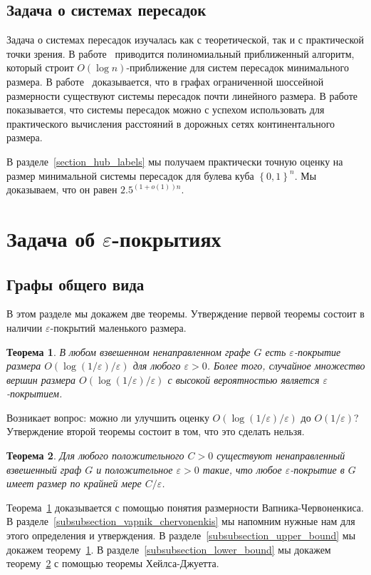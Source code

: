 \documentclass[12pt]{article}
\newcommand{\eps}{\varepsilon}
\newcommand{\set}[1]{\left\{#1\right\}}
\newcommand{\zo}{\set{0, 1}}
\newtheorem{theorem}{Теорема}
\begin{document}
    \subsection{Задача о системах пересадок}

    Задача о системах пересадок изучалась как с теоретической, так и с практической точки зрения.
    В работе~\cite{CHKZ02} приводится полиномиальный приближенный алгоритм, который строит $O(\log n)$-приближение
    для систем пересадок минимального размера.
    В работе~\cite{AFGW10} доказывается, что в графах ограниченной шоссейной размерности существуют системы пересадок
    почти линейного размера.
    В работе~\cite{ADGW11} показывается, что системы пересадок можно с успехом использовать для практического
    вычисления расстояний в дорожных сетях континентального размера.

    В разделе~\ref{section_hub_labels} мы получаем практически точную оценку на размер минимальной системы пересадок
    для булева куба $\zo^n$. Мы доказываем, что он равен $2.5^{(1 + o(1)) n}$.
    \section{Задача об $\eps$-покрытиях}
    \label{section_eps_covers}
    \subsection{Графы общего вида}
    \label{subsection_general_graphs}
    В этом разделе мы докажем две теоремы.
    Утверждение первой теоремы состоит в наличии $\eps$-покрытий маленького размера.
    \begin{theorem}
        \label{upper_bound}
        В любом взвешенном ненаправленном графе $G$ есть $\eps$-покрытие размера $O(\log(1 / \eps) / \eps)$ для
        любого $\eps > 0$. Более того, случайное множество вершин размера $O(\log(1 / \eps) / \eps)$ с высокой вероятностью
        является $\eps$-покрытием.
    \end{theorem}
    Возникает вопрос: можно ли улучшить оценку $O(\log(1 / \eps) / \eps)$ до $O(1 / \eps)$? Утверждение второй теоремы
    состоит в том, что это сделать нельзя.
    \begin{theorem}
        \label{lower_bound}
        Для любого положительного $C > 0$ существуют ненаправленный взвешенный граф $G$ и положительное $\eps > 0$
        такие, что любое $\eps$-покрытие в $G$ имеет размер по крайней мере $C / \eps$.
    \end{theorem}
    Теорема~\ref{upper_bound} доказывается с помощью понятия размерности Вапника-Червоненкиса. В
    разделе~\ref{subsubsection_vapnik_chervonenkis} мы напомним нужные нам для этого определения и утверждения.
    В разделе~\ref{subsubsection_upper_bound} мы докажем теорему~\ref{upper_bound}.
    В разделе~\ref{subsubsection_lower_bound} мы докажем теорему~\ref{lower_bound} с помощью теоремы Хейлса-Джуетта.
\end{document}
